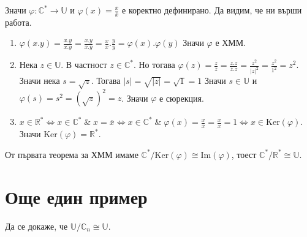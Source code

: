 \documentclass[12pt]{article}
\begin{document}
\begin{enumerate}[label=\alph*)]
    Значи \(\varphi : \mathbb{C}^* \to \mathbb{U}\) и \(\varphi(x) = \displaystyle\frac{x}{\overline{x}}\) е коректно дефинирано.
    Да видим, че ни върши работа.
    \begin{enumerate}[label=\arabic*.]
        \item \(\varphi(x.y) = \displaystyle\frac{x.y}{\overline{x.y}} = \displaystyle\frac{x.y}{\overline{x}.\overline{y}} = \displaystyle\frac{x}{\overline{x}}.\displaystyle\frac{y}{\overline{y}} = \varphi(x).\varphi(y)\) Значи  \(\varphi\) е ХММ.
        \item Нека \(z \in \mathbb{U}\). В частност \(z \in \mathbb{C}^*\).
        Но тогава \(\varphi(z) = \displaystyle\frac{z}{\overline{z}} = \displaystyle\frac{z.z}{\overline{z}.z} = \displaystyle\frac{z^2}{|z|^2} = \displaystyle\frac{z^2}{1^2} = z^2\).
        Значи нека \(s = \sqrt{z}\). Тогава \(|s| = \sqrt{|z|} = \sqrt{1} = 1\)
        Значи \(s \in \mathbb{U}\) и \(\varphi(s) = s^2 = (\sqrt{z})^2 = z\).
        Значи \(\varphi\) е сюрекция.
        \item \(x \in \mathbb{R}^* \iff x \in \mathbb{C}^* \; \& \; x = \overline{x} \iff
        x \in \mathbb{C}^* \; \& \; \varphi(x) = \displaystyle\frac{x}{\overline{x}} = \displaystyle\frac{x}{x} = 1 \iff x \in \mathrm{Ker}(\varphi)\).
        Значи \(\mathrm{Ker}(\varphi) = \mathbb{R}^*\).
    \end{enumerate}
    От първата теорема за ХММ имаме \(\mathbb{C}^* / \mathrm{Ker}(\varphi) \cong \mathrm{Im}(\varphi)\), тоест \(\mathbb{C}^* / \mathbb{R}^* \cong \mathbb{U}\).
\end{enumerate}
\section{Още един пример}
Да се докаже, че \(\mathbb{U} / \mathbb{C}_n \cong \mathbb{U}\).
\end{document}
